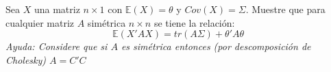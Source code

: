 

\question[10] Sea $X$ una matriz $n\times 1$ con $\mathbb{E}(X)=\theta$ y $Cov(X)=\Sigma$. Muestre que para cualquier matriz $A$ simétrica $n\times n$ se tiene la relación:
$$\mathbb{E}(X'AX)=tr(A\Sigma)+\theta' A \theta$$
\textit{Ayuda: Considere que si $A$ es simétrica entonces (por descomposición de Cholesky) $A=C'C$}

